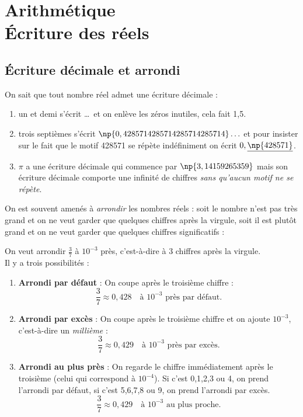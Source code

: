 \documentclass[a4paper,12pt,french]{book}
\begin{document}
\setcounter{chapter}{2}

\chapter{\large Arithmétique\\[-1em]\fontsize{35pt}{42pt}\selectfont\titlefont \'Ecriture des \og réels\fg{}}

\section{\'Ecriture décimale et arrondi}
On sait que tout nombre réel admet une écriture décimale :
\begin{enumerate}[\textbullet]
	\item 	\og  un et demi \fg{} s'écrit \ldots\ et on enlève les zéros inutiles, cela fait 1,5.
	\item 	\og trois septièmes \fg{} s'écrit $\np{0,4285714285714285714285714}\ldots$ et pour insister sur le fait que le motif 428571
			se répète indéfiniment on écrit $0,\underline{\np{428571}}$.
	\item 	$\pi$ a une écriture décimale qui commence par $\np{3,14159265359}$ mais son écriture décimale comporte une infinité de chiffres
	\textit{sans
	qu'aucun motif ne se répète}.
\end{enumerate}

On est souvent amenés à \textit{arrondir} les nombres réels : soit le nombre n'est \og pas très grand\fg{} et on ne veut garder que quelques chiffres
après la virgule, soit il est \og plutôt grand\fg{} et on ne veut garder que quelques chiffres significatifs :

\begin{methode}[ 1]

On veut arrondir $\frac{3}{7}$ à $10^{-3}$ près, c'est-à-dire à 3 chiffres après la virgule.\\
						Il y a trois possibilités :
						\begin{enumerate}[\textbullet]
							\item 	\textbf{Arrondi par défaut} : On \og coupe\fg{} après le troisième chiffre :\\
									$$\frac{3}{7}\approx 0,428\quad\textrm{à }10^{-3}\textrm{ près par défaut.}$$
							\item 	\textbf{Arrondi par excès} : On \og coupe\fg{} après le troisième chiffre et on ajoute $10^{-3}$,
									c'est-à-dire un \textit{millième} :\\
																$$\frac{3}{7}\approx 0,429\quad\textrm{à }10^{-3}\textrm{ près par excès.}$$
							\item 	\textbf{Arrondi au plus près} : On regarde le chiffre immédiatement après le troisième (celui qui correspond
									 à $10^{-4}$). Si c'est 0,1,2,3 ou 4, on prend l'arrondi par défaut, si c'est 5,6,7,8 ou 9, on prend l'arrondi
									par excès.
									$$\frac{3}{7}\approx 0,429\quad\textrm{à }10^{-3}\textrm{ au plus proche.}$$
						\end{enumerate}
\end{methode}
\end{document}
